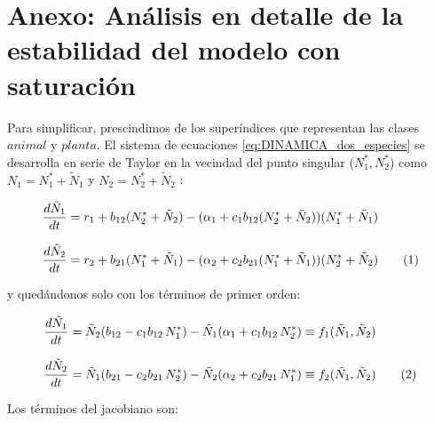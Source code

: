 \clearpage
\section{Anexo: Análisis en detalle de la estabilidad del modelo con saturación}
\label{DINAMICA_ANEXO_estabilidad}

Para simplificar, prescindimos de los superíndices que representan las clases $animal$ y $planta$. 
El sistema de ecuaciones \ref{eq:DINAMICA_dos_especies} se desarrolla en serie de Taylor en la vecindad del punto singular ($N^{*}_{1}, N^{*}_{2}$) como  $N_{1}= N^{*}_1+\tilde{N}_{1}$ y $N_{2}= N^{*}_2+\tilde{N}_{2}$ \cite{murray1993mathematical}:

\begin{equation}
\begin{array}{lcr}
\displaystyle \frac{d\tilde{N}_{1}}{dt} = r_{1}+ b_{12}(N^{*}_2+\tilde{N}_{2})-(\alpha_{1}+ c_{1} b_{12} (N^{*}_2+\tilde{N}_{2}))( N^{*}_1+\tilde{N}_{1})\nonumber\\
\\
\displaystyle \frac{d\tilde{N}_{2}}{dt} = r_{2}+ b_{21}( N^{*}_1+\tilde{N}_{1})-(\alpha_{2}+ c_{2} b_{21}(N^{*}_1+\tilde{N}_{1}))(N^{*}_2+\tilde{N}_{2}) 
\stepcounter{equation}\tag{\theequation}\label{eq:effrateTaylor}
\end{array}
\end{equation}

\noindent y quedándonos solo con los términos de primer orden:

\begin{equation}
\begin{array}{lcr}
\displaystyle \frac{d\tilde{N}_{1}}{dt}= \tilde{N}_{2}( b_{12} - c_{1} b_{12}\, N^{*}_1)-\tilde{N}_{1}(\alpha_{1}+ c_{1} b_{12} \, N^{*}_2) \equiv f_{1}(\tilde{N}_{1},\tilde{N}_{2}) \nonumber\\
\\
\displaystyle \frac{d\tilde{N}_{2}}{dt} = \tilde{N}_{1}( b_{21} - c_{2} b_{21}\, N^{*}_2)-\tilde{N}_{2}(\alpha_{2}+ c_{2} b_{21} \, N^{*}_1) \equiv f_{2}(\tilde{N}_{1},\tilde{N}_{2})
\stepcounter{equation}\tag{\theequation}\label{eq:effrateTaylor2}
\end{array}
\end{equation}

\noindent Los términos del jacobiano son:

